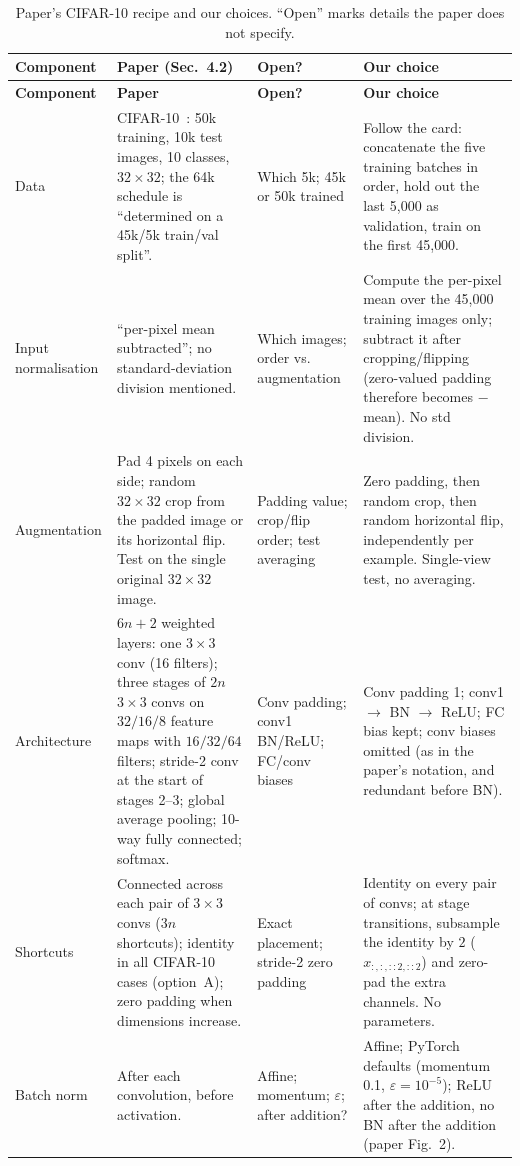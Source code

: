 \documentclass[11pt,a4paper]{article}
\begin{document}
\begin{longtable}{@{}p{2.4cm}p{4.3cm}p{2.6cm}p{6.0cm}@{}}
\caption{Paper's CIFAR-10 recipe and our choices. ``Open'' marks details the paper does not specify.}\label{tab:recipe}\\
\toprule
\textbf{Component} & \textbf{Paper (Sec.~4.2)} & \textbf{Open?} & \textbf{Our choice}\\
\midrule
\endfirsthead
\toprule
\textbf{Component} & \textbf{Paper} & \textbf{Open?} & \textbf{Our choice}\\
\midrule
\endhead
Data & CIFAR-10~\cite{krizhevsky}: 50k training, 10k test images, 10 classes, $32\times32$; the 64k schedule is ``determined on a 45k/5k train/val split''. & Which 5k; 45k or 50k trained & Follow the card: concatenate the five training batches in order, hold out the last 5{,}000 as validation, train on the first 45{,}000.\\
Input normalisation & ``per-pixel mean subtracted''; no standard-deviation division mentioned. & Which images; order vs. augmentation & Compute the per-pixel mean over the 45{,}000 training images only; subtract it after cropping/flipping (zero-valued padding therefore becomes $-$mean). No std division.\\
Augmentation & Pad 4 pixels on each side; random $32\times32$ crop from the padded image or its horizontal flip. Test on the single original $32\times32$ image. & Padding value; crop/flip order; test averaging & Zero padding, then random crop, then random horizontal flip, independently per example. Single-view test, no averaging.\\
Architecture & $6n+2$ weighted layers: one $3\times3$ conv (16 filters); three stages of $2n$ $3\times3$ convs on $32/16/8$ feature maps with $16/32/64$ filters; stride-2 conv at the start of stages 2--3; global average pooling; 10-way fully connected; softmax. & Conv padding; conv1 BN/ReLU; FC/conv biases & Conv padding 1; conv1 $\to$ BN $\to$ ReLU; FC bias kept; conv biases omitted (as in the paper's notation, and redundant before BN).\\
Shortcuts & Connected across each pair of $3\times3$ convs ($3n$ shortcuts); identity in all CIFAR-10 cases (option~A); zero padding when dimensions increase. & Exact placement; stride-2 zero padding & Identity on every pair of convs; at stage transitions, subsample the identity by $2$ ($x_{:,:,::2,::2}$) and zero-pad the extra channels. No parameters.\\
Batch norm & After each convolution, before activation. & Affine; momentum; $\varepsilon$; after addition? & Affine; PyTorch defaults (momentum 0.1, $\varepsilon=10^{-5}$); ReLU after the addition, no BN after the addition (paper Fig.~2).\\

\end{longtable}
\end{document}
